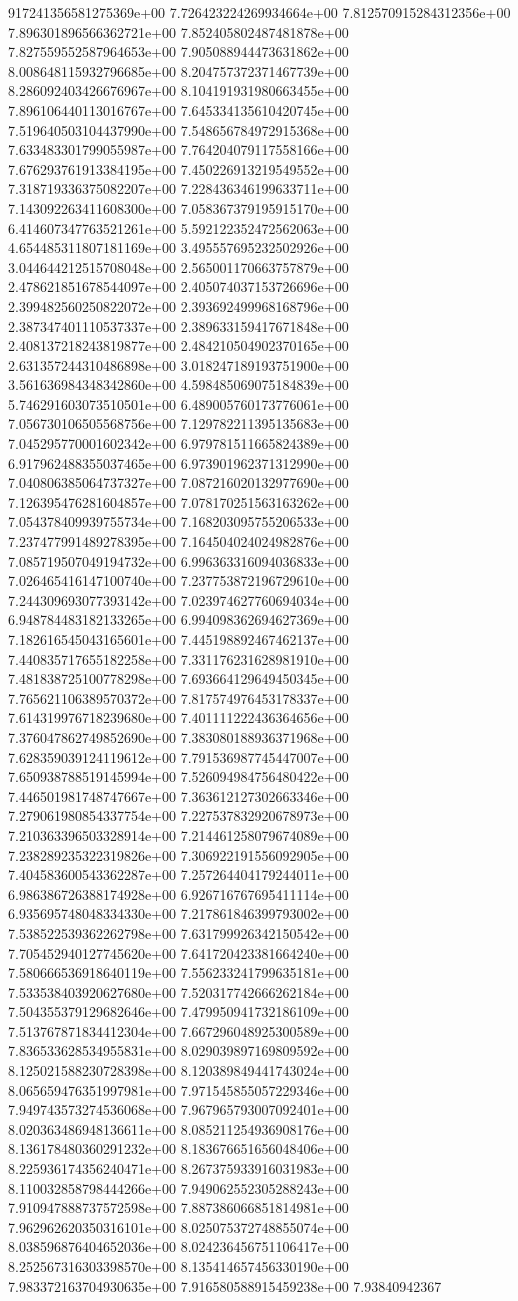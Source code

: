 917241356581275369e+00	7.726423224269934664e+00	7.812570915284312356e+00	7.896301896566362721e+00	7.852405802487481878e+00	7.827559552587964653e+00	7.905088944473631862e+00	8.008648115932796685e+00	8.204757372371467739e+00	8.286092403426676967e+00	8.104191931980663455e+00	7.896106440113016767e+00	7.645334135610420745e+00	7.519640503104437990e+00	7.548656784972915368e+00	7.633483301799055987e+00	7.764204079117558166e+00	7.676293761913384195e+00	7.450226913219549552e+00	7.318719336375082207e+00	7.228436346199633711e+00	7.143092263411608300e+00	7.058367379195915170e+00	6.414607347763521261e+00	5.592122352472562063e+00	4.654485311807181169e+00	3.495557695232502926e+00	3.044644212515708048e+00	2.565001170663757879e+00	2.478621851678544097e+00	2.405074037153726696e+00	2.399482560250822072e+00	2.393692499968168796e+00	2.387347401110537337e+00	2.389633159417671848e+00	2.408137218243819877e+00	2.484210504902370165e+00	2.631357244310486898e+00	3.018247189193751900e+00	3.561636984348342860e+00	4.598485069075184839e+00	5.746291603073510501e+00	6.489005760173776061e+00	7.056730106505568756e+00	7.129782211395135683e+00	7.045295770001602342e+00	6.979781511665824389e+00	6.917962488355037465e+00	6.973901962371312990e+00	7.040806385064737327e+00	7.087216020132977690e+00	7.126395476281604857e+00	7.078170251563163262e+00	7.054378409939755734e+00	7.168203095755206533e+00	7.237477991489278395e+00	7.164504024024982876e+00	7.085719507049194732e+00	6.996363316094036833e+00	7.026465416147100740e+00	7.237753872196729610e+00	7.244309693077393142e+00	7.023974627760694034e+00	6.948784483182133265e+00	6.994098362694627369e+00	7.182616545043165601e+00	7.445198892467462137e+00	7.440835717655182258e+00	7.331176231628981910e+00	7.481838725100778298e+00	7.693664129649450345e+00	7.765621106389570372e+00	7.817574976453178337e+00	7.614319976718239680e+00	7.401111222436364656e+00	7.376047862749852690e+00	7.383080188936371968e+00	7.628359039124119612e+00	7.791536987745447007e+00	7.650938788519145994e+00	7.526094984756480422e+00	7.446501981748747667e+00	7.363612127302663346e+00	7.279061980854337754e+00	7.227537832920678973e+00	7.210363396503328914e+00	7.214461258079674089e+00	7.238289235322319826e+00	7.306922191556092905e+00	7.404583600543362287e+00	7.257264404179244011e+00	6.986386726388174928e+00	6.926716767695411114e+00	6.935695748048334330e+00	7.217861846399793002e+00	7.538522539362262798e+00	7.631799926342150542e+00	7.705452940127745620e+00	7.641720423381664240e+00	7.580666536918640119e+00	7.556233241799635181e+00	7.533538403920627680e+00	7.520317742666262184e+00	7.504355379129682646e+00	7.479950941732186109e+00	7.513767871834412304e+00	7.667296048925300589e+00	7.836533628534955831e+00	8.029039897169809592e+00	8.125021588230728398e+00	8.120389849441743024e+00	8.065659476351997981e+00	7.971545855057229346e+00	7.949743573274536068e+00	7.967965793007092401e+00	8.020363486948136611e+00	8.085211254936908176e+00	8.136178480360291232e+00	8.183676651656048406e+00	8.225936174356240471e+00	8.267375933916031983e+00	8.110032858798444266e+00	7.949062552305288243e+00	7.910947888737572598e+00	7.887386066851814981e+00	7.962962620350316101e+00	8.025075372748855074e+00	8.038596876404652036e+00	8.024236456751106417e+00	8.252567316303398570e+00	8.135414657456330190e+00	7.983372163704930635e+00	7.916580588915459238e+00	7.93840942367